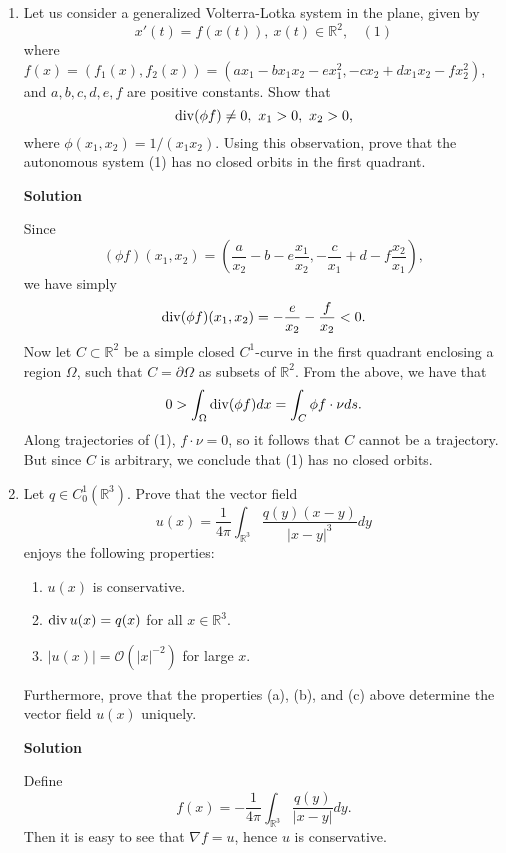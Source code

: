 \documentclass{article}
\def\div{\mathop{\rm div}\nolimits}
\begin{document}
\begin{enumerate}
\item Let us consider a generalized Volterra-Lotka system in the plane, given by
\[x'(t) = f(x(t)), \ x(t) \in \mathbb{R}^2, \ \ \ \ (1)\]
where \(f(x) = (f_1(x),f_2(x)) = (a x_1 - b x_1 x_2 - e x_1^2, -c x_2 + d x_1 x_2 - f x_2^2)\), and \(a, b, c, d, e, f\) are positive constants.  Show that
\[\div(\phi f) \neq 0, \ x_1 > 0, \ x_2 > 0,\]
where \(\phi(x_1,x_2) = 1/(x_1 x_2)\).  Using this observation, prove that the autonomous system (1) has no closed orbits in the first quadrant.

{\bf Solution}

Since
\[(\phi f)(x_1,x_2) = \left( \frac{a}{x_2} - b - e \frac{x_1}{x_2}, -\frac{c}{x_1} + d - f \frac{x_2}{x_1} \right),\]
we have simply
\[\div(\phi f)(x_1,x_2) = -\frac{e}{x_2} - \frac{f}{x_2} < 0.\]
Now let \(C \subset \mathbb{R}^2\) be a simple closed \(C^1\)-curve in the first quadrant enclosing a region \(\Omega\), such that \(C = \partial\Omega\) as subsets of \(\mathbb{R}^2\).  From the above, we have that
\[0 > \int_{\Omega} \div(\phi f) dx = \int_C \phi f \cdot \nu ds.\]
Along trajectories of (1), \(f \cdot \nu = 0\), so it follows that \(C\) cannot be a trajectory.  But since \(C\) is arbitrary, we conclude that (1) has no closed orbits.



\item Let \(q \in C_0^1(\mathbb{R}^3)\).  Prove that the vector field
\[u(x) = \frac{1}{4 \pi} \int_{\mathbb{R}^3} \frac{q(y) (x - y)}{|x - y|^3} dy\]
enjoys the following properties:

\begin{enumerate}
\item \(u(x)\) is conservative.

\item \(\div u(x) = q(x)\) for all \(x \in \mathbb{R}^3\).

\item \(|u(x)| = \mathcal{O}(|x|^{-2})\) for large \(x\).

\end{enumerate}

Furthermore, prove that the properties (a), (b), and (c) above determine the vector field \(u(x)\) uniquely.

{\bf Solution}

Define
\[f(x) = -\frac{1}{4 \pi} \int_{\mathbb{R}^3} \frac{q(y)}{|x - y|} dy.\]
Then it is easy to see that \(\nabla f = u\), hence \(u\) is conservative.


\end{enumerate}
\end{document}
